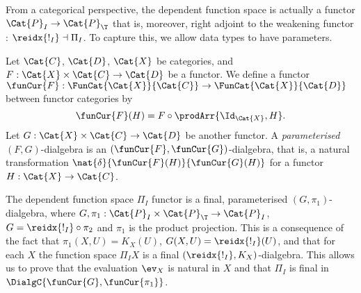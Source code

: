 \documentclass[preprint]{sigplanconf}
\begin{document}
From a categorical perspective, the dependent function space is actually a
functor $\Cat{P}_I \to \Cat{P}_{\T}$ that is, moreover, right adjoint to the
weakening functor : $\reidx{!_I} \dashv \Pi_I$.
To capture this, we allow data types to have parameters.
\begin{definition}
  \label{def:parameterised-dialg}
  Let $\Cat{C}$, $\Cat{D}$, $\Cat{X}$ be categories, and
  $F : \Cat{X} \times \Cat{C} \to \Cat{D}$ be a functor.
  We define a functor
  $\funCur{F} : \FunCat{\Cat{X}}{\Cat{C}} \to \FunCat{\Cat{X}}{\Cat{D}}$
  between functor categories by
  \begin{equation}
    \funCur{F}(H) = F \circ \prodArr{\Id_{\Cat{X}}, H}.
  \end{equation}
  Let $G : \Cat{X} \times \Cat{C} \to \Cat{D}$ be another functor.
  A \emph{parameterised} $(F, G)$-dialgebra is an
  $(\funCur{F}, \funCur{G})$-dialgebra, that is, a natural transformation
  $\nat{\delta}{\funCur{F}(H)}{\funCur{G}(H)}$ for a functor
  $H : \Cat{X} \to \Cat{C}$.
\end{definition}

\begin{example}
  The dependent function space $\Pi_I$ functor is a final, parameterised
  $(G, \pi_1)$-dialgebra, where
  $G, \pi_1 : \Cat{P}_I \times \Cat{P}_{\T} \to \Cat{P}_I$,
  $G = \reidx{!_I} \circ \pi_2$ and
  $\pi_1$ is the product projection.
  This is a consequence of the fact that $\pi_1(X, U) = K_X(U)$,
  $G(X, U) = \reidx{!_I}(U)$, and that for each $X$ the function
  space $\Pi_IX$ is a final $(\reidx{!_I}, K_X)$-dialgebra.
  This allows us to prove that the evaluation $\ev_X$ is natural in $X$
  and that $\Pi_I$ is final in $\DialgC{\funCur{G}, \funCur{\pi_1}}$.
  \qedDef
\end{example}
\end{document}
